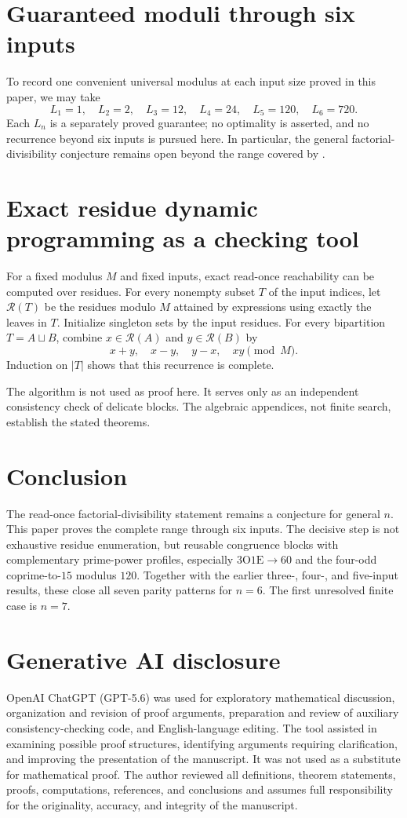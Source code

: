 \documentclass[11pt]{amsart}
\theoremstyle{definition}
\theoremstyle{remark}
\newcommand{\Rset}{\mathcal R}
\newcommand{\OO}{\mathrm O}
\newcommand{\EE}{\mathrm E}
\begin{document}
\section{Guaranteed moduli through six inputs}

To record one convenient universal modulus at each input size proved in this
paper, we may take
\[
 L_1=1,\quad L_2=2,\quad L_3=12,\quad L_4=24,\quad
 L_5=120,\quad L_6=720.
\]
Each $L_n$ is a separately proved guarantee; no optimality is asserted, and
no recurrence beyond six inputs is pursued here.  In particular, the general
factorial-divisibility conjecture remains open beyond the range covered by
.

\section{Exact residue dynamic programming as a checking tool}

For a fixed modulus $M$ and fixed inputs, exact read-once reachability can be
computed over residues.  For every nonempty subset $T$ of the input indices,
let $\Rset(T)$ be the residues modulo $M$ attained by expressions using
exactly the leaves in $T$.  Initialize singleton sets by the input residues.
For every bipartition $T=A\sqcup B$, combine $x\in\Rset(A)$ and
$y\in\Rset(B)$ by
\[
 x+y,\quad x-y,\quad y-x,\quad xy\pmod M.
\]
Induction on $|T|$ shows that this recurrence is complete.

The algorithm is not used as proof here.  It serves only as an independent
consistency check of delicate blocks.  The algebraic appendices, not finite
search, establish the stated theorems.

\section{Conclusion}
The read-once factorial-divisibility statement remains a conjecture for
general $n$.  This paper proves the complete range through six inputs.  The
decisive step is not exhaustive residue enumeration, but reusable congruence
blocks with complementary prime-power profiles, especially
$3\OO1\EE\to60$ and the four-odd coprime-to-$15$ modulus $120$.  Together
with the earlier three-, four-, and five-input results, these close all seven
parity patterns for $n=6$.  The first unresolved finite case is $n=7$.

\section*{Generative AI disclosure}
OpenAI ChatGPT (GPT-5.6) was used for exploratory mathematical discussion,
organization and revision of proof arguments, preparation and review of
auxiliary consistency-checking code, and English-language editing.  The tool
assisted in examining possible proof structures, identifying arguments
requiring clarification, and improving the presentation of the manuscript.
It was not used as a substitute for mathematical proof.  The author reviewed
all definitions, theorem statements, proofs, computations, references, and
conclusions and assumes full responsibility for the originality, accuracy,
and integrity of the manuscript.
\end{document}
